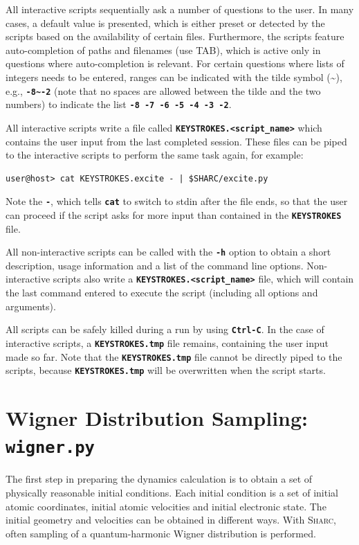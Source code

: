 \documentclass[a4paper,10pt,DIV=15,openany,twoside=false]{scrbook}
\newcommand{\sharc}{\textsc{Sharc}}
\newcommand{\ttt}[1]{\textbf{\texttt{#1}}}
\begin{document}
All interactive scripts sequentially ask a number of questions to the user. In many cases, a default value is presented, which is either preset or detected by the scripts based on the availability of certain files. Furthermore, the scripts feature auto-completion of paths and filenames (use TAB), which is active only in questions where auto-completion is relevant. For certain questions where lists of integers needs to be entered, ranges can be indicated with the tilde symbol (\textasciitilde), e.g., \ttt{-8\textasciitilde-2} (note that no spaces are allowed between the tilde and the two numbers) to indicate the list \ttt{-8 -7 -6 -5 -4 -3 -2}. 

All interactive scripts write a file called \ttt{KEYSTROKES.<script\_name>} which contains the user input from the last completed session. These files can be piped to the interactive scripts to perform the same task again, for example:
\begin{verbatim}
user@host> cat KEYSTROKES.excite - | $SHARC/excite.py
\end{verbatim}
Note the \ttt{-}, which tells \ttt{cat} to switch to stdin after the file ends, so that the user can proceed if the script asks for more input than contained in the \ttt{KEYSTROKES} file.

All non-interactive scripts can be called with the \ttt{-h} option to obtain a short description, usage information and a list of the command line options.
Non-interactive scripts also write a \ttt{KEYSTROKES.<script\_name>} file, which will contain the last command entered to execute the script (including all options and arguments).

All scripts can be safely killed during a run by using \ttt{Ctrl-C}. In the case of interactive scripts, a \ttt{KEYSTROKES.tmp} file remains, containing the user input made so far. Note that the \ttt{KEYSTROKES.tmp} file cannot be directly piped to the scripts, because \ttt{KEYSTROKES.tmp} will be overwritten when the script starts.




\section{Wigner Distribution Sampling: \ttt{wigner.py}}\label{sec:wigner.py}

The first step in preparing the dynamics calculation is to obtain a set of physically reasonable initial conditions. Each initial condition is a set of initial atomic coordinates, initial atomic velocities and initial electronic state. The initial geometry and velocities can be obtained in different ways. With \sharc, often sampling of a quantum-harmonic Wigner distribution is performed. 
\end{document}
